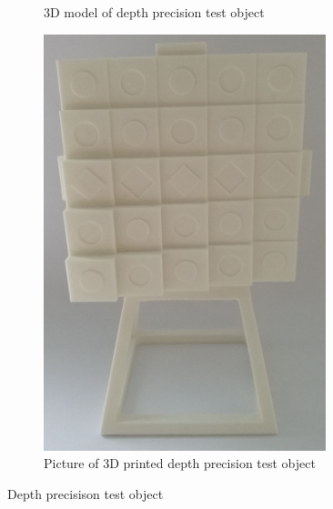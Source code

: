 \begin{figure}[ht]
  \centering
  \begin{subfigure}[t]{0.45\textwidth}
    \centering{}
    \caption{3D model of depth precision test object}
    \label{fig:3dpretest}
  \end{subfigure}\hspace{0.5cm}
  \begin{subfigure}[t]{0.45\textwidth}
    \centering\includegraphics[width=0.9\textwidth]{figures/testobject_foot}
    \caption{Picture of 3D printed depth precision test object}
    \label{fig:3dpretestpic}
  \end{subfigure}
  \caption{Depth precisison test object \label{fig:3dpreobj}}
\end{figure}
